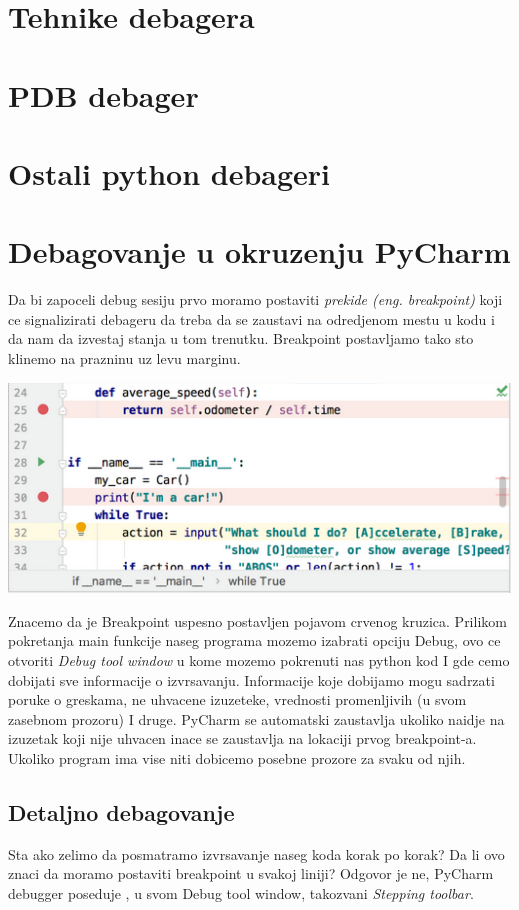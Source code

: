 \documentclass[a4paper]{article}
\begin{document}
\section{Tehnike debagera}

\section{PDB debager}

\section{Ostali python debageri}

\section{Debagovanje u okruzenju PyCharm}
Da bi zapoceli debug sesiju prvo moramo postaviti \emph{prekide (eng. breakpoint)} koji ce signalizirati debageru  da treba da se zaustavi na odredjenom mestu u kodu i da nam da izvestaj stanja u tom trenutku. Breakpoint postavljamo tako sto klinemo na prazninu uz levu marginu.

\includegraphics[scale = 0.4]{1}

Znacemo da je Breakpoint uspesno postavljen pojavom crvenog kruzica. Prilikom pokretanja main funkcije naseg programa mozemo izabrati opciju Debug, ovo ce otvoriti \emph{Debug tool window} u kome mozemo pokrenuti nas python kod I gde cemo dobijati sve informacije o izvrsavanju. Informacije koje dobijamo mogu sadrzati poruke o greskama, ne uhvacene izuzeteke, vrednosti promenljivih (u svom zasebnom prozoru) I druge. PyCharm se automatski zaustavlja ukoliko naidje na izuzetak koji nije uhvacen inace se zaustavlja na lokaciji prvog breakpoint-a. Ukoliko program ima vise niti dobicemo posebne prozore za svaku od njih.
\subsection{Detaljno debagovanje}
Sta ako zelimo da posmatramo izvrsavanje naseg koda korak po korak? Da li ovo znaci da moramo postaviti breakpoint u svakoj liniji? Odgovor je ne, PyCharm debugger poseduje , u svom Debug tool window, takozvani \emph{Stepping toolbar}.
\end{document}
